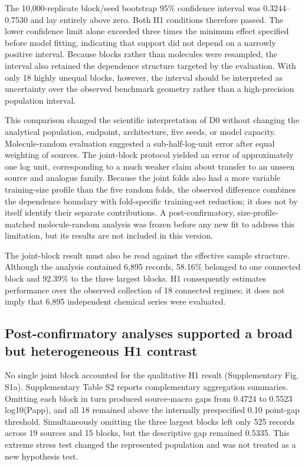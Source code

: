 \documentclass[referee,lineno,pdflatex,sn-vancouver-num]{sn-jnl}
\begin{document}
The 10,000-replicate block/seed bootstrap 95\% confidence interval was 0.3244--0.7530 and lay entirely above zero. Both H1 conditions therefore passed. The lower confidence limit alone exceeded three times the minimum effect specified before model fitting, indicating that support did not depend on a narrowly positive interval. Because blocks rather than molecules were resampled, the interval also retained the dependence structure targeted by the evaluation. With only 18 highly unequal blocks, however, the interval should be interpreted as uncertainty over the observed benchmark geometry rather than a high-precision population interval.

This comparison changed the scientific interpretation of D0 without changing the analytical population, endpoint, architecture, five seeds, or model capacity. Molecule-random evaluation suggested a sub-half-log-unit error after equal weighting of sources. The joint-block protocol yielded an error of approximately one log unit, corresponding to a much weaker claim about transfer to an unseen source and analogue family. Because the joint folds also had a more variable training-size profile than the five random folds, the observed difference combines the dependence boundary with fold-specific training-set reduction; it does not by itself identify their separate contributions. A post-confirmatory, size-profile-matched molecule-random analysis was frozen before any new fit to address this limitation, but its results are not included in this version.

The joint-block result must also be read against the effective sample structure. Although the analysis contained 6,895 records, 58.16\% belonged to one connected block and 92.39\% to the three largest blocks. H1 consequently estimates performance over the observed collection of 18 connected regimes; it does not imply that 6,895 independent chemical series were evaluated.

\subsection{Post-confirmatory analyses supported a broad but heterogeneous H1 contrast}

No single joint block accounted for the qualitative H1 result (Supplementary Fig. S1a). Supplementary Table S2 reports complementary aggregation summaries. Omitting each block in turn produced source-macro gaps from 0.4724 to 0.5523 log10(Papp), and all 18 remained above the internally prespecified 0.10 point-gap threshold. Simultaneously omitting the three largest blocks left only 525 records across 19 sources and 15 blocks, but the descriptive gap remained 0.5335. This extreme stress test changed the represented population and was not treated as a new hypothesis test.
\end{document}
